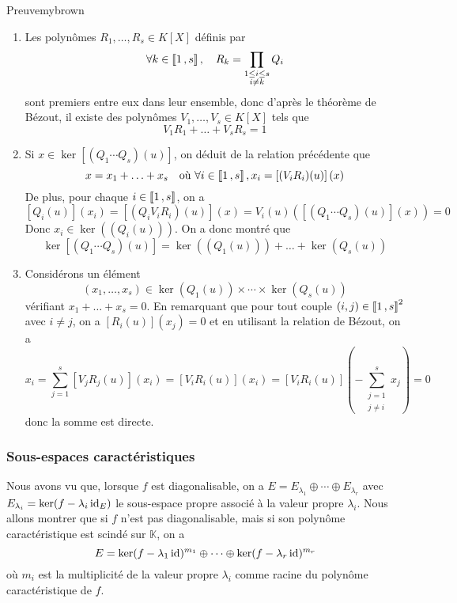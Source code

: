     \begin{demo}{Preuve}{mybrown}
        \begin{enumerate}[label=\textcolor{myjade}{(\arabic*)}]
            \item Les polynômes $R_1,\ldots,R_s \in K[X]$ définis par 
            \[ \forall k \in \left\llbracket 1 \, , s \right\rrbracket, \quad R_k = \prod_{\substack{1 \leq i \leq s \\ i \neq k}} Q_i \]    
            sont premiers entre eux dans leur ensemble, donc d’après le théorème de Bézout, il existe des polynômes $V_1, \ldots, V_s \in K[X]$ tels que 
            \[ V_1 R_1 + \ldots + V_s R_s = 1 \]    
            \item Si $x \in \ker\left[(Q_1\cdots Q_s)(u)\right]$, on déduit de la relation précédente que 
            \[ x = x_1 + \ldots + x_s \quad \text{où } \forall i \in \left\llbracket 1 \, , s \right\rrbracket, x_i = \left[(V_i R_i)(u)\right](x) \]
            De plus, pour chaque $i \in \left\llbracket 1 \, , s \right\rrbracket$, on a 
            \[ \left[Q_i(u)\right](x_i) = \left[(Q_i V_i R_i)(u)\right](x) = V_i(u) \left(\left[(Q_1 \cdots Q_s)(u)\right](x)\right) = 0 \]
            Donc $x_i \in \ker((Q_i(u)))$. On a donc montré que 
            \[ \ker\left[(Q_1 \cdots Q_s)(u)\right] = \ker\left((Q_1(u))\right) + \ldots + \ker\left(Q_s(u)\right) \]     
            \item Considérons un élément 
            \[ (x_1,\ldots,x_s) \in \ker(Q_1(u)) \times \cdots \times \ker(Q_s(u)) \]   
            vérifiant $x_1 + \ldots + x_s = 0$. En remarquant que pour tout couple $(i,j) \in \left\llbracket 1 \, , s \right\rrbracket^2$ avec $i \neq j$, on a $\left[R_i(u)\right](x_j) = 0$ et en utilisant la relation de Bézout, on a 
            \[ x_i = \sum_{j=1}^{s} \left[V_j R_j(u)\right](x_i) = \left[V_i R_i (u)\right](x_i) = \left[V_i R_i(u)\right]\left(- \sum_{\substack{j = 1 \\ j \neq i}}^{s} x_j\right) = 0 \]
            donc la somme est directe.
        \end{enumerate}
    \end{demo}

    \subsubsection{Sous-espaces caractéristiques}

    Nous avons vu que, lorsque $f$ est diagonalisable, on a $E = E_{\lambda_1} \oplus \cdots \oplus E_{\lambda_r}$ avec $E_{\lambda_i} = \ker(f - \lambda_i \operatorname{id}_E)$ le sous-espace propre associé à la valeur propre $\lambda_i$. Nous allons montrer que si $f$ n’est pas diagonalisable, mais si son polynôme caractéristique est scindé sur $\mathbb{K}$, on a 
    \[ E = \ker(f - \lambda_1 \operatorname{id})^{m_1} \oplus \cdots \oplus \ker(f - \lambda_r \operatorname{id})^{m_r} \]   
    où $m_i$ est la multiplicité de la valeur propre $\lambda_i$ comme racine du polynôme caractéristique de $f$.

